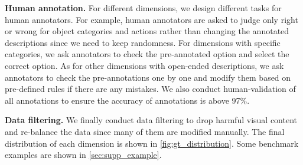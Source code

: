 \noindent\textbf{Human annotation.}
For different dimensions, we design different tasks for human annotators. For example, human annotators are asked to judge only right or wrong for object categories and actions rather than changing the annotated descriptions since we need to keep randomness. For dimensions with specific categories, we ask annotators to check the pre-annotated option and select the correct option. As for other dimensions with open-ended descriptions, we ask annotators to check the pre-annotations one by one and modify them based on pre-defined rules if there are any mistakes. We also conduct human-validation of all annotations to ensure the accuracy of annotations is above 97\%.

\noindent\textbf{Data filtering.}
We finally conduct data filtering to drop harmful visual content and re-balance the data since many of them are modified manually. The final distribution of each dimension is shown in \cref{fig:gt_distribution}. Some benchmark examples are shown in \cref{sec:supp_example}.

